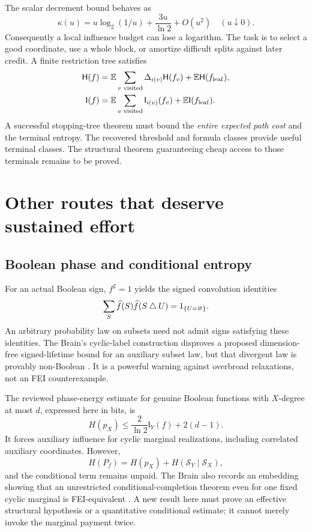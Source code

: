 \documentclass[11pt]{article}
\newcommand{\HH}{\mathsf H}\newcommand{\I}{\mathsf I}
\newcommand{\E}{\mathbb E}\newcommand{\Pp}{\mathbb P}
\begin{document}
The scalar decrement bound behaves as
\[
 \kappa(u)=u\log_2(1/u)+\frac{3u}{\ln2}+O(u^2)
 \quad(u\downarrow0).
\]
Consequently a local influence budget can lose a logarithm. The task is to select a good coordinate, use a whole block, or amortize difficult splits against later credit. A finite restriction tree satisfies
\begin{align*}
 \HH(f)&=\E\sum_{v\text{ visited}}\Delta_{i(v)}\HH(f_v)
                +\E\HH(f_{\rm leaf}),\\
 \I(f)&=\E\sum_{v\text{ visited}}\I_{i(v)}(f_v)
                +\E\I(f_{\rm leaf}).
\end{align*}
A successful stopping-tree theorem must bound the \emph{entire expected path cost} and the terminal entropy. The recovered threshold and formula classes provide useful terminal classes. The structural theorem guaranteeing cheap access to those terminals remains to be proved.

\section{Other routes that deserve sustained effort}

\subsection{Boolean phase and conditional entropy}

For an actual Boolean sign, $f^2=1$ yields the signed convolution identities
\[
 \sum_S\widehat{f}(S)\widehat{f}(S\mathbin\triangle U)=1_{\{U=\varnothing\}}.
\]
An arbitrary probability law on subsets need not admit signs satisfying these identities. The Brain's cyclic-label construction disproves a proposed dimension-free signed-lifetime bound for an auxiliary subset law, but that divergent law is provably non-Boolean \cite{Brain51}. It is a powerful warning against overbroad relaxations, not an FEI counterexample.

The reviewed phase-energy estimate for genuine Boolean functions with $X$-degree at most $d$, expressed here in bits, is
\[
 H(p_X)\le\frac2{\ln2}\I_Y(f)+2(d-1).
\]
It forces auxiliary influence for cyclic marginal realizations, including correlated auxiliary coordinates. However,
\[
 H(P_f)=H(p_X)+H(\mathcal S_Y\mid\mathcal S_X),
\]
and the conditional term remains unpaid. The Brain also records an embedding showing that an unrestricted conditional-completion theorem even for one fixed cyclic marginal is FEI-equivalent \cite{Brain54}. A new result here must prove an effective structural hypothesis or a quantitative conditional estimate; it cannot merely invoke the marginal payment twice.
\end{document}
